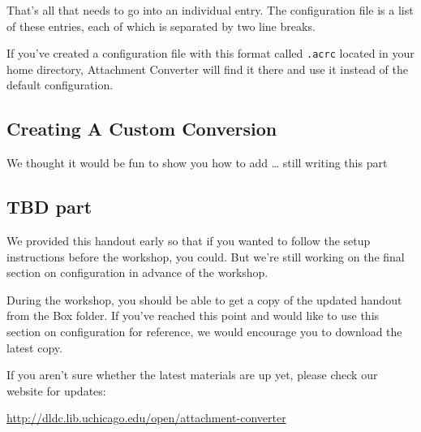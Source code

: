 \documentclass[11pt]{article}
\begin{document}
That's all that needs to go into an individual entry.  The
configuration file is a list of these entries, each of which is
separated by two line breaks.

If you've created a configuration file with this format called \texttt{.acrc}
located in your home directory, Attachment Converter will find it
there and use it instead of the default configuration.

\subsection{Creating A Custom Conversion}
\label{sec:org53d3893}

We thought it would be fun to show you how to add \ldots{} still writing
this part

\subsection{TBD part}
\label{sec:org104d0fa}

We provided this handout early so that if you wanted to follow the
setup instructions before the workshop, you could.  But we're still
working on the final section on configuration in advance of the
workshop.

During the workshop, you should be able to get a copy of the updated
handout from the Box folder.  If you've reached this point and would
like to use this section on configuration for reference, we would
encourage you to download the latest copy.

If you aren't sure whether the latest materials are up yet, please
check our website for updates:

\url{http://dldc.lib.uchicago.edu/open/attachment-converter}
\end{document}
